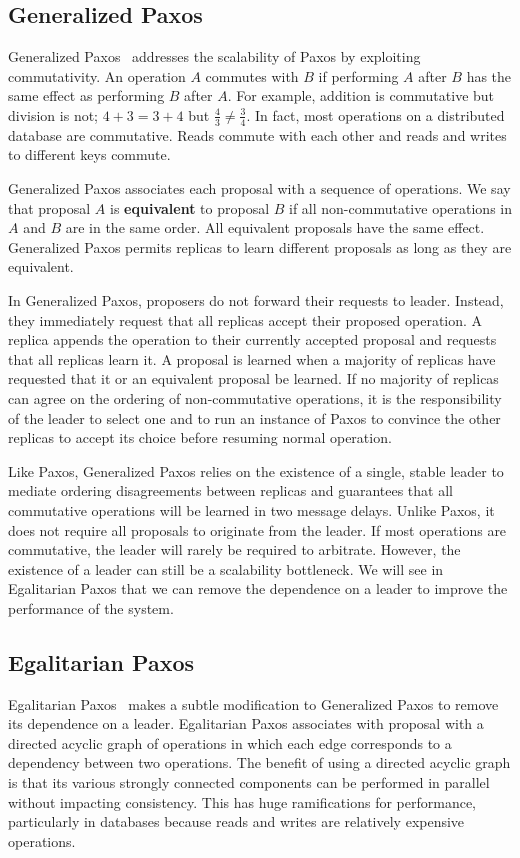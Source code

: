 \documentclass[../main.tex]{subfiles}
\begin{document}
  \subsection{Generalized Paxos}
  Generalized Paxos~\cite{generalized-paxos} addresses the scalability of Paxos by exploiting
  commutativity. An operation $A$ commutes with $B$ if performing $A$ after $B$ has the same effect
  as performing $B$ after $A$. For example, addition is commutative but division is not;
  $4 + 3 = 3 + 4$ but $\frac{4}{3} \ne \frac{3}{4}$. In fact, most operations on a distributed
  database are commutative. Reads commute with each other and reads and writes to different keys
  commute.

  Generalized Paxos associates each proposal with a sequence of operations. We say that proposal $A$
  is \textbf{equivalent} to proposal $B$ if all non-commutative operations in $A$ and $B$ are in the
  same order. All equivalent proposals have the same effect. Generalized Paxos permits replicas to
  learn different proposals as long as they are equivalent.

  In Generalized Paxos, proposers do not forward their requests to leader. Instead, they immediately
  request that all replicas accept their proposed operation. A replica appends the operation to
  their currently accepted proposal and requests that all replicas learn it. A proposal is learned
  when a majority of replicas have requested that it or an equivalent proposal be learned.
  If no majority of replicas can agree on the ordering of non-commutative operations, it is the
  responsibility of the leader to select one and to run an instance of Paxos to convince the other
  replicas to accept its choice before resuming normal operation.

  Like Paxos, Generalized Paxos relies on the existence of a single, stable leader to mediate
  ordering disagreements between replicas and guarantees that all commutative operations will be
  learned in two message delays. Unlike Paxos, it does not require all proposals to originate from
  the leader. If most operations are commutative, the leader will rarely be required to arbitrate.
  However, the existence of a leader can still be a scalability bottleneck. We will see in
  Egalitarian Paxos that we can remove the dependence on a leader to improve the performance of the
  system.

  \subsection{Egalitarian Paxos}
  Egalitarian Paxos~\cite{epaxos} makes a subtle modification to Generalized Paxos to remove its
  dependence on a leader. Egalitarian Paxos associates with proposal with a directed acyclic graph
  of operations in which each edge corresponds to a dependency between two operations. The benefit
  of using a directed acyclic graph is that its various strongly connected components can be
  performed in parallel without impacting consistency. This has huge ramifications for performance,
  particularly in databases because reads and writes are relatively expensive operations.
\end{document}
